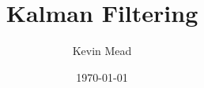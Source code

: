 \documentclass[12pt,a4paper]{article}
\newcommand{\+}[1]{\ensuremath{\mathbf{#1}}}
\begin{document}
 
\title{Kalman Filtering} 
\author{Kevin Mead}

\date{\today} 
\maketitle 






\end{document}
